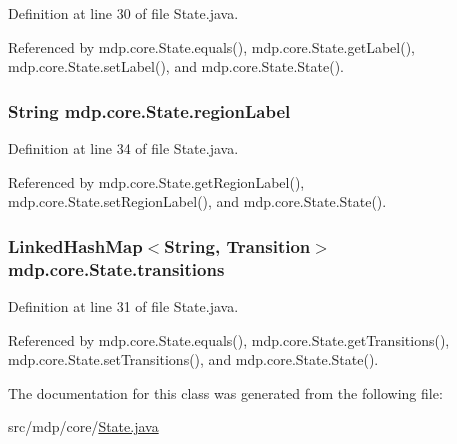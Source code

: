 Definition at line 30 of file State.\+java.



Referenced by mdp.\+core.\+State.\+equals(), mdp.\+core.\+State.\+get\+Label(), mdp.\+core.\+State.\+set\+Label(), and mdp.\+core.\+State.\+State().

\hypertarget{classmdp_1_1core_1_1_state_aa6f24dca5cb78d028e99f69b9e6ccb2c}{}
\subsubsection[{region\+Label}]{\setlength{\rightskip}{0pt plus 5cm}String mdp.\+core.\+State.\+region\+Label\hspace{0.3cm}{\ttfamily [private]}}\label{classmdp_1_1core_1_1_state_aa6f24dca5cb78d028e99f69b9e6ccb2c}


Definition at line 34 of file State.\+java.



Referenced by mdp.\+core.\+State.\+get\+Region\+Label(), mdp.\+core.\+State.\+set\+Region\+Label(), and mdp.\+core.\+State.\+State().

\hypertarget{classmdp_1_1core_1_1_state_a3c9b563199f7e235fe083b0d16da8cf3}{}
\subsubsection[{transitions}]{\setlength{\rightskip}{0pt plus 5cm}Linked\+Hash\+Map$<$String, {\bf Transition}$>$ mdp.\+core.\+State.\+transitions\hspace{0.3cm}{\ttfamily [private]}}\label{classmdp_1_1core_1_1_state_a3c9b563199f7e235fe083b0d16da8cf3}


Definition at line 31 of file State.\+java.



Referenced by mdp.\+core.\+State.\+equals(), mdp.\+core.\+State.\+get\+Transitions(), mdp.\+core.\+State.\+set\+Transitions(), and mdp.\+core.\+State.\+State().



The documentation for this class was generated from the following file\+:\begin{DoxyCompactItemize}
\item 
src/mdp/core/\hyperlink{_state_8java}{State.\+java}\end{DoxyCompactItemize}
